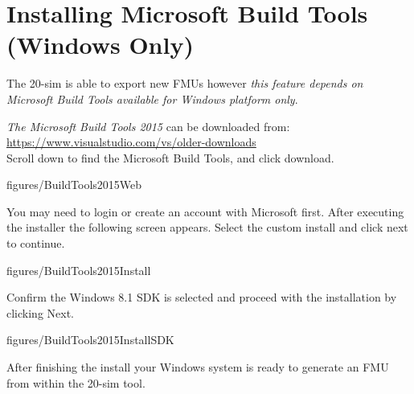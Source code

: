 \documentclass[11pt,a4paper]{../tutorial}
\begin{document}
\newpage

\section{Installing Microsoft Build Tools (Windows Only)} The 20-sim is able to export new FMUs however \emph{this feature depends on Microsoft Build Tools available for Windows platform only}.


\begin{instructions}

\item \emph{The Microsoft Build Tools 2015} can be downloaded from: \\ \url{https://www.visualstudio.com/vs/older-downloads}\\ Scroll down to find the Microsoft Build Tools, and click download. 

    \begin{annotation}[width=0.8\linewidth,trim=0 15cm 0 0,clip ]{figures/BuildTools2015Web}
    \end{annotation}


\item You may need to login or create an account with Microsoft first. After executing the installer the following screen appears. Select the custom install and click next to continue.

   \begin{annotation}[width=0.3\linewidth]{figures/BuildTools2015Install}
    \end{annotation}
\newpage

\item Confirm the Windows 8.1 SDK is selected and proceed with the installation by clicking Next. 

   \begin{annotation}[width=0.3\linewidth]{figures/BuildTools2015InstallSDK}
   \end{annotation}

   After finishing the install your Windows system is ready to generate an FMU from within the 20-sim tool. 
\end{instructions}
\end{document}
